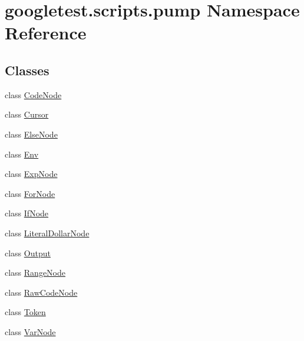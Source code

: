 \hypertarget{namespacegoogletest_1_1scripts_1_1pump}{}\section{googletest.\+scripts.\+pump Namespace Reference}
\label{namespacegoogletest_1_1scripts_1_1pump}
\subsection*{Classes}
\begin{DoxyCompactItemize}
\item 
class \mbox{\hyperlink{classgoogletest_1_1scripts_1_1pump_1_1_code_node}{Code\+Node}}
\item 
class \mbox{\hyperlink{classgoogletest_1_1scripts_1_1pump_1_1_cursor}{Cursor}}
\item 
class \mbox{\hyperlink{classgoogletest_1_1scripts_1_1pump_1_1_else_node}{Else\+Node}}
\item 
class \mbox{\hyperlink{classgoogletest_1_1scripts_1_1pump_1_1_env}{Env}}
\item 
class \mbox{\hyperlink{classgoogletest_1_1scripts_1_1pump_1_1_exp_node}{Exp\+Node}}
\item 
class \mbox{\hyperlink{classgoogletest_1_1scripts_1_1pump_1_1_for_node}{For\+Node}}
\item 
class \mbox{\hyperlink{classgoogletest_1_1scripts_1_1pump_1_1_if_node}{If\+Node}}
\item 
class \mbox{\hyperlink{classgoogletest_1_1scripts_1_1pump_1_1_literal_dollar_node}{Literal\+Dollar\+Node}}
\item 
class \mbox{\hyperlink{classgoogletest_1_1scripts_1_1pump_1_1_output}{Output}}
\item 
class \mbox{\hyperlink{classgoogletest_1_1scripts_1_1pump_1_1_range_node}{Range\+Node}}
\item 
class \mbox{\hyperlink{classgoogletest_1_1scripts_1_1pump_1_1_raw_code_node}{Raw\+Code\+Node}}
\item 
class \mbox{\hyperlink{classgoogletest_1_1scripts_1_1pump_1_1_token}{Token}}
\item 
class \mbox{\hyperlink{classgoogletest_1_1scripts_1_1pump_1_1_var_node}{Var\+Node}}
\end{DoxyCompactItemize}
